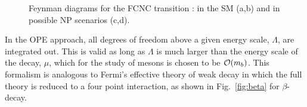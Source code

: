 \begin{figure}[!tb]
\begin{subfigure}{0.49\textwidth}
\caption{}
\label{fig:btosll:d}
\end{subfigure}
\caption{Feynman diagrams for the FCNC transition \btosll: in the SM (a,b) and in possible NP scenarios (c,d).}
\label{fig:btosll}
\end{figure}

In the OPE approach, all degrees of freedom above a given energy scale, $\Lambda$, are integrated out. This is valid as long as $\Lambda$ is much larger than the energy scale of the decay, $\mu$, which for the study of \B mesons is chosen to be ${\mathcal{O}}(m_{{b}})$. This formalism is analogous to Fermi's effective theory of weak decay in which the full theory is reduced to a four point interaction, as shown in Fig.~\ref{fig:beta} for $\beta$-decay.

